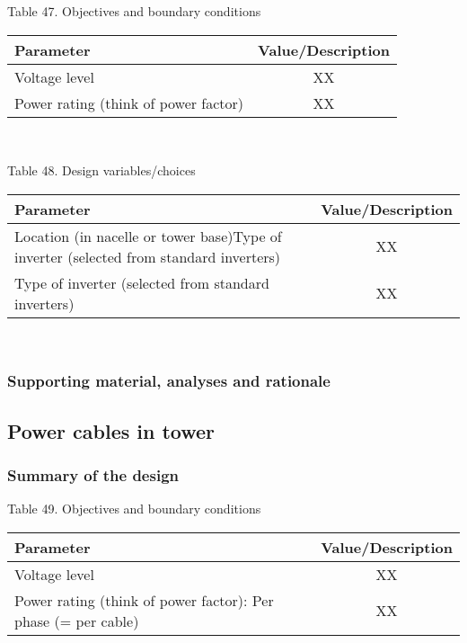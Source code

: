 \begin{center}
Table 47. Objectives and boundary conditions\\
\begin{tabular}{ |l|c| } 
\hline
\textbf{Parameter} & \textbf{Value/Description}  \\ 
\hline
Voltage level & XX  \\ 
\hline
Power rating (think of power factor) & XX \\
\hline
\end{tabular} \\
\end{center}

\begin{center}
Table 48. Design variables/choices\\
\begin{tabular}{ |l|c| } 
\hline
\textbf{Parameter} & \textbf{Value/Description}  \\ 
\hline
Location (in nacelle or tower base)Type of inverter (selected from standard inverters) & XX  \\ 
\hline
Type of inverter (selected from standard inverters) & XX \\
\hline
\end{tabular} \\
\end{center}

\subsubsection{Supporting material, analyses and rationale}



\subsection{Power cables in tower}

\subsubsection{Summary of the design}

\begin{center}
Table 49. Objectives and boundary conditions\\
\begin{tabular}{ |l|c| } 
\hline
\textbf{Parameter} & \textbf{Value/Description}  \\ 
\hline
Voltage level & XX  \\ 
\hline
Power rating (think of power factor): Per phase (= per cable) & XX \\
\hline
\end{tabular} \\
\end{center}

